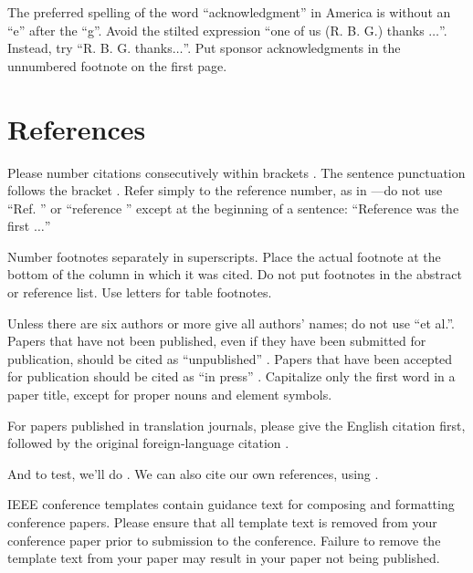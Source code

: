 \documentclass[conference]{IEEEtran}
\begin{document}
The preferred spelling of the word ``acknowledgment'' in America is without 
an ``e'' after the ``g''. Avoid the stilted expression ``one of us (R. B. 
G.) thanks $\ldots$''. Instead, try ``R. B. G. thanks$\ldots$''. Put sponsor 
acknowledgments in the unnumbered footnote on the first page.

\section*{References}

Please number citations consecutively within brackets \cite{report:zhu2024scalable}. The 
sentence punctuation follows the bracket \cite{report:zhu2024scalable}. Refer simply to the reference 
number, as in \cite{report:zhu2024scalable}---do not use ``Ref. \cite{report:zhu2024scalable}'' or ``reference \cite{report:zhu2024scalable}'' except at 
the beginning of a sentence: ``Reference \cite{report:zhu2024scalable} was the first $\ldots$''

Number footnotes separately in superscripts. Place the actual footnote at 
the bottom of the column in which it was cited. Do not put footnotes in the 
abstract or reference list. Use letters for table footnotes.

Unless there are six authors or more give all authors' names; do not use 
``et al.''. Papers that have not been published, even if they have been 
submitted for publication, should be cited as ``unpublished'' \cite{report:zhu2024scalable}. Papers 
that have been accepted for publication should be cited as ``in press'' \cite{report:zhu2024scalable}. 
Capitalize only the first word in a paper title, except for proper nouns and 
element symbols.

For papers published in translation journals, please give the English 
citation first, followed by the original foreign-language citation \cite{report:zhu2024scalable}.

And to test, we'll do \cite{IEEEexample:bluebookstandard}. We can also cite our own references, using \cite{report:zhu2024scalable}.

\color{black}



\vspace{12pt}

\color{red}
IEEE conference templates contain guidance text for composing and formatting conference papers. Please ensure that all template text is removed from your conference paper prior to submission to the conference. Failure to remove the template text from your paper may result in your paper not being published.
\end{document}
